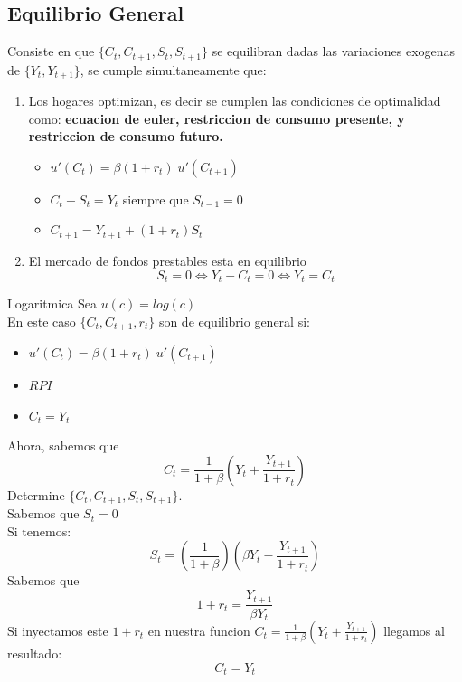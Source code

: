\documentclass[12pt]{article}
\begin{document}
\subsection{Equilibrio General}
Consiste en que $\{C_t,C_{t+1},S_t,S_{t+1}\}$ se equilibran dadas las variaciones exogenas de $\{Y_t,Y_{t+1}\}$, se cumple simultaneamente que: 
\begin{enumerate}
    \item Los hogares optimizan, es decir se cumplen las condiciones de optimalidad como: \textbf{ecuacion de euler, restriccion de consumo presente, y restriccion de consumo futuro.}
    \begin{itemize}
        \item $u'(C_t)=\beta (1+r_t)\; u'(C_{t+1})$
        \item $C_t+S_t=Y_t$ siempre que $S_{t-1}=0$
        \item $C_{t+1}=Y_{t+1}+(1+r_t)S_t$
    \end{itemize}
    \item El mercado de fondos prestables esta en equilibrio
    $$S_t=0 \iff Y_t-C_t=0 \iff Y_t=C_t$$
\end{enumerate}
\begin{ejemplo}{Logaritmica}
    Sea $u(c)=log(c)$\\
    En este caso $\{C_t,C_{t+1},r_t\}$ son de equilibrio general si: 
    \begin{itemize}
        \item $u'(C_t)=\beta (1+r_t)\; u'(C_{t+1})$
        \item $RPI$
        \item $C_t=Y_t$
    \end{itemize}
    Ahora, sabemos que $$C_t=\frac{1}{1+\beta}(Y_t+\frac{Y_{t+1}}{1+r_t})$$
    Determine $\{C_t,C_{t+1},S_t,S_{t+1}\}$. \\
    Sabemos que $S_t=0$\\
    Si tenemos: $$S_t=(\frac{1}{1+\beta})(\beta Y_t-\frac{Y_{t+1}}{1+r_t})$$ 
    Sabemos que $$1+r_t=\frac{Y_{t+1}}{\beta Y_t}$$
    Si inyectamos este $1+r_t$ en nuestra funcion $C_t=\frac{1}{1+\beta}(Y_t+\frac{Y_{t+1}}{1+r_t})$ llegamos al resultado: $$C_t=Y_t$$
\end{ejemplo}
\end{document}
